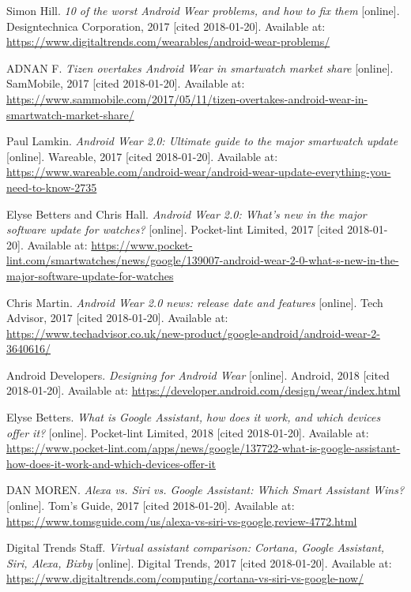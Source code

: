 \begin{thebibliography}{10}
Simon Hill. \textit{10 of the worst Android Wear problems, and how to fix them} [online]. Designtechnica Corporation, 2017 [cited 2018-01-20]. Available at: \url{https://www.digitaltrends.com/wearables/android-wear-problems/}

ADNAN F. \textit{Tizen overtakes Android Wear in smartwatch market share} [online]. SamMobile, 2017 [cited 2018-01-20]. Available at: \url{https://www.sammobile.com/2017/05/11/tizen-overtakes-android-wear-in-smartwatch-market-share/}

Paul Lamkin. \textit{Android Wear 2.0: Ultimate guide to the major smartwatch update} [online]. Wareable, 2017 [cited 2018-01-20]. Available at: \url{https://www.wareable.com/android-wear/android-wear-update-everything-you-need-to-know-2735}

Elyse Betters and Chris Hall. \textit{Android Wear 2.0: What's new in the major software update for watches?} [online]. Pocket-lint Limited, 2017 [cited 2018-01-20]. Available at: \url{https://www.pocket-lint.com/smartwatches/news/google/139007-android-wear-2-0-what-s-new-in-the-major-software-update-for-watches}

Chris Martin. \textit{Android Wear 2.0 news: release date and features} [online]. Tech Advisor, 2017 [cited 2018-01-20]. Available at: \url{https://www.techadvisor.co.uk/new-product/google-android/android-wear-2-3640616/}

Android Developers. \textit{Designing for Android Wear} [online]. Android, 2018 [cited 2018-01-20]. Available at: \url{https://developer.android.com/design/wear/index.html}

Elyse Betters. \textit{What is Google Assistant, how does it work, and which devices offer it?} [online]. Pocket-lint Limited, 2018 [cited 2018-01-20]. Available at: \url{https://www.pocket-lint.com/apps/news/google/137722-what-is-google-assistant-how-does-it-work-and-which-devices-offer-it}

DAN MOREN. \textit{Alexa vs. Siri vs. Google Assistant: Which Smart Assistant Wins?} [online]. Tom's Guide, 2017 [cited 2018-01-20]. Available at: \url{https://www.tomsguide.com/us/alexa-vs-siri-vs-google,review-4772.html}

Digital Trends Staff. \textit{Virtual assistant comparison: Cortana, Google Assistant, Siri, Alexa, Bixby} [online]. Digital Trends, 2017 [cited 2018-01-20]. Available at: \url{https://www.digitaltrends.com/computing/cortana-vs-siri-vs-google-now/}


\end{thebibliography}

